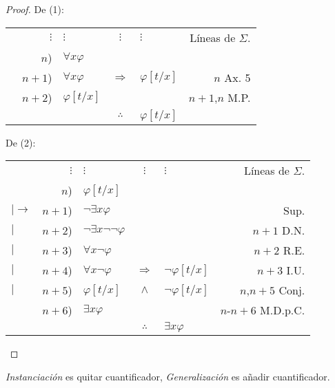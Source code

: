 \documentclass[12pt]{report}
\newcounter{it}
\theoremstyle{largebreak}
\begin{document}
    \begin{proof}
        De (1):
        \begin{center}
            \begin{tabular}{l r l c l r}
                & $\vdots$ & $\vdots$ & $\vdots$ & $\vdots$ & Líneas de $\Sigma$. \\
                 & $n$) & $\forall x\varphi$ &  &  &  \\
                 & $n+1$) & $\forall x\varphi$ & $\Rightarrow$ & $\varphi[t/x]$ & $n$ Ax. 5 \\
                 & $n+2$) & $\varphi[t/x]$ &  &  & $n+1$,$n$ M.P. \\
                \hline
                & & & $\therefore$ & $\varphi[t/x]$ & \\
            \end{tabular}
        \end{center}
        De (2):
        \begin{center}
            \begin{tabular}{l r l c l r}
                & $\vdots$ & $\vdots$ & $\vdots$ & $\vdots$ & Líneas de $\Sigma$. \\
                 & $n$) & $\varphi[t/x]$ &  &  &  \\
                $|\longrightarrow$ & $n+1$) & $\neg\exists x\varphi$ &  &  & Sup. \\
                $|$ & $n+2$) & $\neg\exists x\neg\neg\varphi$ &  &  & $n+1$ D.N. \\
                $|$ & $n+3$) & $\forall x\neg\varphi$ &  &  & $n+2$ R.E. \\
                $|$ & $n+4$) & $\forall x\neg\varphi$ & $\Rightarrow$ & $\neg\varphi[t/x]$ & $n+3$ I.U. \\
                $|$ & $n+5$) & $\varphi[t/x]$ & $\land$ & $\neg\varphi[t/x]$ & $n$,$n+5$ Conj. \\
                \hline
                 & $n+6$) & $\exists x\varphi$ &  &  & $n$-$n+6$ M.D.p.C. \\
                \hline
                & & & $\therefore$ & $\exists x\varphi$ & \\
            \end{tabular}
        \end{center}
    \end{proof}

    \begin{obs}
        \textit{Instanciación} es quitar cuantificador, \textit{Generalización} es añadir cuantificador.
    \end{obs}
\end{document}
